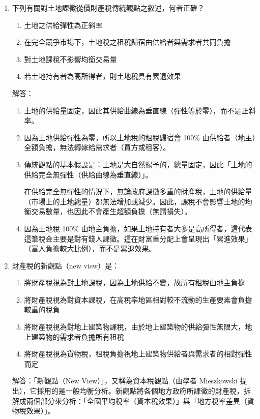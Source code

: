 \documentclass[12pt, a4paper]{article}
\begin{document}
\begin{enumerate}
    \item 下列有關對土地課徵從價財產稅傳統觀點之敘述，何者正確？
    \begin{enumerate}[label=\Alph*.]
        \item 土地之供給彈性為正斜率
        \item 在完全競爭市場下，土地稅之租稅歸宿由供給者與需求者共同負擔
        \item 對土地課稅不影響均衡交易量
        \item 若土地持有者為高所得者，則土地稅具有累退效果
    \end{enumerate}
    解答：
    \begin{enumerate}[label=\Alph*.]
        \item 土地的供給量固定，因此其供給曲線為垂直線（彈性等於零），而不是正斜率。
        \item 因為土地供給彈性為零，所以土地稅的租稅歸宿會 100\% 由供給者（地主）全額負擔，無法轉嫁給需求者（買方或租客）。
        \item 傳統觀點的基本假設是：土地是大自然賜予的，總量固定，因此「土地的供給完全無彈性（供給曲線為垂直線）」。

        在供給完全無彈性的情況下，無論政府課徵多重的財產稅，土地的供給量（市場上的土地總量）都無法增加或減少。因此，課稅不會影響土地的均衡交易數量，也因此不會產生超額負擔（無謂損失）。
        \item 因為土地稅 100\% 由地主負擔，如果土地持有者大多是高所得者，這代表這筆稅金主要是對有錢人課徵。這在財富重分配上會呈現出「累進效果」（富人負擔較大比例），而不是累退效果。
    \end{enumerate}

    \item 財產稅的新觀點（new view）是：
    \begin{enumerate}[label=\Alph*.]
        \item 將財產稅視為對土地課稅，因為土地供給不變，故所有租稅由地主負擔
        \item 將財產稅視為對資本課稅，在高稅率地區相對較不流動的生產要素會負擔較重的稅負
        \item 將財產稅視為對地上建築物課稅，由於地上建築物的供給彈性無限大，地上建築物的需求者負擔所有租稅
        \item 將財產稅視為貨物稅，租稅負擔視地上建築物供給者與需求者的相對彈性而定
    \end{enumerate}
    解答：「新觀點（New View）」，又稱為資本稅觀點（由學者 Mieszkowski 提出），它採用的是一般均衡分析。新觀點將各個地方政府所課徵的財產稅，拆解成兩個部分來分析：「全國平均稅率（資本稅效果）」與「地方稅率差異（貨物稅效果）」。


\end{enumerate}
\end{document}
